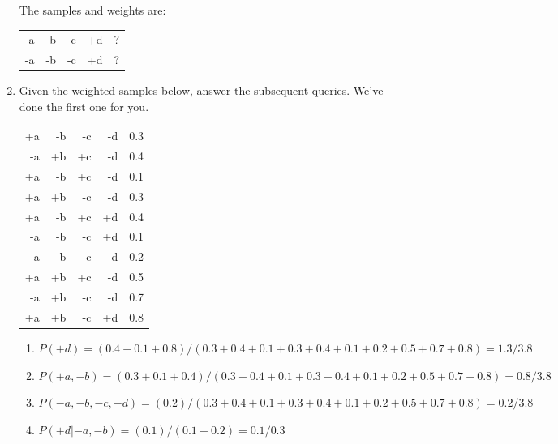 \documentclass[12pt]{article}
\begin{document}
\begin{enumerate}
The samples and weights are:

\begin{flushleft}
\begin{tabular}{rrrrr}
-a & -b & -c & +d & ?\\
-a & -b & -c & +d & ?\\
\end{tabular}
\end{flushleft}

\item Given the weighted samples below, answer the subsequent queries. We've done the first one for you.

\begin{flushleft}
\begin{tabular}{rrrrr} 
+a & -b & -c & -d & 0.3 \\
-a & +b & +c & -d & 0.4 \\
+a & -b & +c & -d & 0.1 \\
+a & +b & -c & -d & 0.3 \\
+a & -b & +c & +d & 0.4 \\
-a & -b & -c & +d & 0.1 \\
-a & -b & -c & -d & 0.2 \\
+a & +b & +c & -d & 0.5 \\
-a & +b & -c & -d & 0.7 \\
+a & +b & -c & +d & 0.8 \\
\end{tabular}
\end{flushleft}

\begin{enumerate}

  \item $P(+d) = (0.4+0.1+0.8)/(0.3+0.4+0.1+0.3+0.4+0.1+0.2+0.5+0.7+0.8) = 1.3/3.8$

  \item $P(+a,-b) = (0.3+0.1+0.4)/(0.3+0.4+0.1+0.3+0.4+0.1+0.2+0.5+0.7+0.8) = 0.8/3.8$

  \item $P(-a,-b,-c,-d) = (0.2)/(0.3+0.4+0.1+0.3+0.4+0.1+0.2+0.5+0.7+0.8) = 0.2/3.8$

  \item $P(+d | -a, -b) = (0.1)/(0.1+0.2) = 0.1/0.3 $

\end{enumerate}

\end{enumerate}
\end{document}

